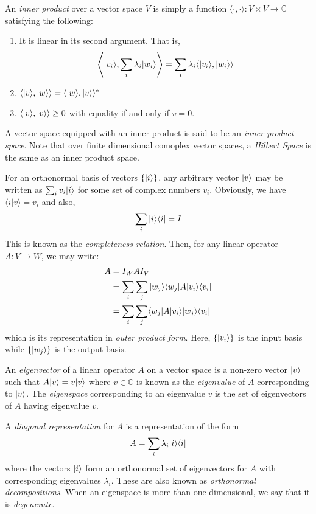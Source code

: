 An \textit{inner product} over a vector space $V$ is simply a function $\langle\cdot,\cdot\rangle:V\times V\to\mathbb{C}$ satisfying the following:
\begin{enumerate}
    \item It is linear in its second argument. That is,
    \begin{equation*}
        \left\langle|v_i\rangle,\sum_i\lambda_i|w_i\rangle\right\rangle = \sum_{i}\lambda_i\langle|v_i\rangle,|w_i\rangle\rangle
    \end{equation*}
    \item $\langle|v\rangle,|w\rangle\rangle = \langle|w\rangle,|v\rangle\rangle^*$
    \item $\langle|v\rangle,|v\rangle\rangle\ge0$ with equality if and only if $v = 0$.
\end{enumerate}
A vector space equipped with an inner product is said to be an \textit{inner product space}. Note that over finite dimensional comoplex vector spaces, a \textit{Hilbert Space} is the same as an inner product space.

For an orthonormal basis of vectors $\{|i\rangle\}$, any arbitrary vector $|v\rangle$ may be written as $\sum_iv_i|i\rangle$ for some set of complex numbers $v_i$. Obviously, we have $\langle i|v\rangle = v_i$ and also, 
\begin{equation*}
    \sum_i|i\rangle\langle i| = I
\end{equation*}
This is known as the \textit{completeness relation}. Then, for any linear operator $A:V\to W$, we may write:
\begin{align*}
    A &= I_WAI_V\\
    &= \sum_i\sum_j |w_j\rangle\langle w_j|A|v_i\rangle\langle v_i|\\
    &= \sum_i\sum_j \langle w_j|A|v_i\rangle|w_j\rangle\langle v_i|
\end{align*}
which is its representation in \textit{outer product form}. Here, $\{|v_i\rangle\}$ is the input basis while $\{|w_j\rangle\}$ is the output basis. 

An \textit{eigenvector} of a linear operator $A$ on a vector space is a non-zero vector $|v\rangle$ such that $A|v\rangle = v|v\rangle$ where $v\in\mathbb{C}$ is known as the \textit{eigenvalue} of $A$ corresponding to $|v\rangle$. The \textit{eigenspace} corresponding to an eigenvalue $v$ is the set of eigenvectors of $A$ having eigenvalue $v$.

A \textit{diagonal representation} for $A$ is a representation of the form 
\begin{equation*}
    A = \sum_i\lambda_i|i\rangle\langle i|
\end{equation*}
where the vectors $|i\rangle$ form an orthonormal set of eigenvectors for $A$ with corresponding eigenvalues $\lambda_i$. These are also known as \textit{orthonormal decompositions}. When an eigenspace is more than one-dimensional, we say that it is \textit{degenerate}. 


